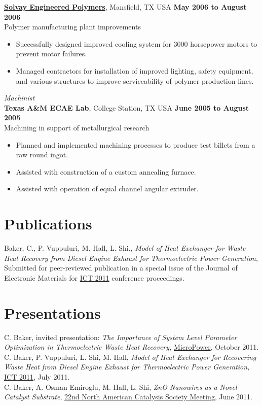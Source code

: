 \documentclass[centered]{res}
\begin{document}
\begin{resume}
\href{http://www.lyondellbasell.com/LandingPages/SolvayEngineeredPolymers}{\textbf{Solvay
    Engineered Polymers}}, Mansfield, TX USA 
\hfill \textbf{May 2006 to August 2006} \\
Polymer manufacturing plant improvements 
\begin{itemize} \itemsep -2pt %
\item Successfully designed improved cooling system for 3000
  horsepower motors to prevent motor failures.
\item Managed contractors for installation of improved lighting,
  safety equipment, and various structures to improve serviceability
  of polymer production lines.
\end{itemize}
%
\textit{Machinist} \\
\textbf{Texas A\&M ECAE Lab}, College Station, TX USA
\hfill \textbf{June 2005 to August 2005} \\
Machining in support of metallurgical research 
\begin{itemize} \itemsep -2pt %
\item Planned and implemented machining processes to produce test
  billets from a raw round ingot.
\item Assisted with construction of a custom annealing furnace.
\item Assisted with operation of equal channel angular extruder.
\end{itemize}

\section{Publications}

Baker, C., P. Vuppuluri, M. Hall, L. Shi., \textit{Model of Heat
  Exchanger for Waste Heat Recovery from Diesel Engine Exhaust for
  Thermoelectric Power Generation}, Submitted for peer-reviewed
publication in a special issue of the Journal of Electronic Materials
for \href{http://ict2011.its.org/}{ICT 2011} conference proceedings.

\section{Presentations}
C. Baker, invited presentation: \textit{The Importance of System Level
Parameter Optimization in Thermoelectric Waste Heat Recovery,}
\href{http://www.micropower-global.com/our_company/texasstate/}{MicroPower},
October 2011. \\
C. Baker, P. Vuppuluri, L. Shi, M. Hall, \textit{Model of Heat Exchanger for
Recovering Waste Heat from Diesel Engine Exhaust for Thermoelectric
Power Generation,}
\href{http://ict2011.its.org/}{ICT 2011}, July 2011. \\
C. Baker, A. Osman Emiroglu, M. Hall, L. Shi, \textit{ZnO Nanowires as a
Novel Catalyst Substrate}, \href{http://www.22nam.org/}{22nd North
  American Catalysis Society Meeting}, June 2011.


\end{resume}
\end{document}
